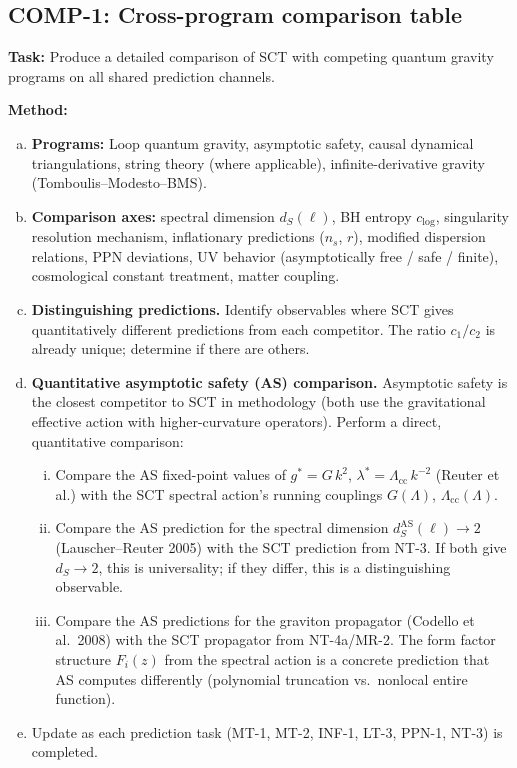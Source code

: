 \documentclass[12pt,a4paper]{article}
\newcommand{\task}[1]{\noindent\textbf{Task:} #1\par}
\newcommand{\method}[1]{\noindent\textbf{Method:} #1\par}
\begin{document}
\subsection{COMP-1: Cross-program comparison table}
\label{task:COMP1}

\task{Produce a detailed comparison of SCT with competing quantum gravity
programs on all shared prediction channels.}

\method{
\begin{enumerate}[(a)]
  \item \textbf{Programs:} Loop quantum gravity, asymptotic safety,
    causal dynamical triangulations, string theory (where applicable),
    infinite-derivative gravity (Tomboulis--Modesto--BMS).
  \item \textbf{Comparison axes:} spectral dimension $d_S(\ell)$,
    BH entropy $c_{\log}$, singularity resolution mechanism, inflationary
    predictions ($n_s$, $r$), modified dispersion relations, PPN deviations,
    UV behavior (asymptotically free / safe / finite), cosmological
    constant treatment, matter coupling.
  \item \textbf{Distinguishing predictions.} Identify observables where SCT
    gives quantitatively different predictions from each competitor.
    The ratio $c_1/c_2$ is already unique; determine if there are others.
  \item \textbf{Quantitative asymptotic safety (AS) comparison.}
    Asymptotic safety is the closest competitor to SCT in methodology (both use
    the gravitational effective action with higher-curvature operators). Perform
    a direct, quantitative comparison:
    \begin{enumerate}[(i)]
      \item Compare the AS fixed-point values of $g^* = G\,k^2$,
        $\lambda^* = \Lambda_{\text{cc}}\,k^{-2}$ (Reuter et al.) with the
        SCT spectral action's running couplings $G(\Lambda)$, $\Lambda_{\text{cc}}(\Lambda)$.
      \item Compare the AS prediction for the spectral dimension
        $d_S^{\text{AS}}(\ell) \to 2$ (Lauscher--Reuter 2005) with the SCT
        prediction from NT-3. If both give $d_S \to 2$, this is universality;
        if they differ, this is a distinguishing observable.
      \item Compare the AS predictions for the graviton propagator (Codello et al.\
        2008) with the SCT propagator from NT-4a/MR-2. The form factor structure
        $F_i(z)$ from the spectral action is a concrete prediction that AS
        computes differently (polynomial truncation vs.\ nonlocal entire function).
    \end{enumerate}
  \item Update as each prediction task (MT-1, MT-2, INF-1, LT-3, PPN-1,
    NT-3) is completed.
\end{enumerate}
}
\end{document}

